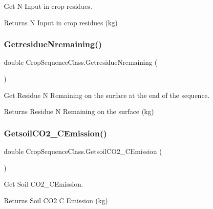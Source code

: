Get N Input in crop residues. 

\begin{DoxyReturn}{Returns}
N Input in crop residues (kg) 
\end{DoxyReturn}
\mbox{\label{class_crop_sequence_class_a27436b7d13bd24370f86e6d684ca2de4}} 
\subsubsection{\texorpdfstring{GetresidueNremaining()}{GetresidueNremaining()}}
{\footnotesize\ttfamily double Crop\+Sequence\+Class.\+Getresidue\+Nremaining (\begin{DoxyParamCaption}{ }\end{DoxyParamCaption})\hspace{0.3cm}{\ttfamily [inline]}}



Get Residue N Remaining on the surface at the end of the sequence. 

\begin{DoxyReturn}{Returns}
Residue N Remaining on the surface (kg) 
\end{DoxyReturn}
\mbox{\label{class_crop_sequence_class_a4e23005ff8a380dd656fe12571788da2}} 
\subsubsection{\texorpdfstring{GetsoilCO2\_CEmission()}{GetsoilCO2\_CEmission()}}
{\footnotesize\ttfamily double Crop\+Sequence\+Class.\+Getsoil\+C\+O2\+\_\+\+C\+Emission (\begin{DoxyParamCaption}{ }\end{DoxyParamCaption})\hspace{0.3cm}{\ttfamily [inline]}}



Get Soil C\+O2\+\_\+\+C\+Emission. 

\begin{DoxyReturn}{Returns}
Soil C\+O2 C Emission (kg) 
\end{DoxyReturn}
\mbox{\label{class_crop_sequence_class_a5bd7053c09e78daefbaa5affdbf7071d}} 
